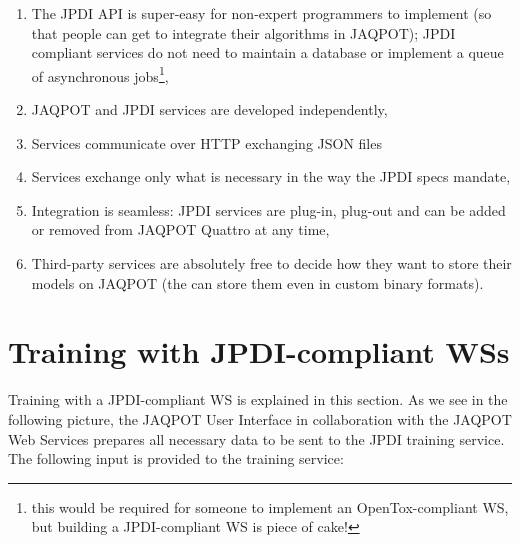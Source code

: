 \begin{enumerate}
 \item The JPDI API is super-easy for non-expert programmers to 
 implement (so that people can get to integrate their algorithms in
 JAQPOT); JPDI compliant services do not need to maintain a database
 or implement a queue of asynchronous jobs\footnote{this would be
 required for someone to implement an OpenTox-compliant WS, but building
 a JPDI-compliant WS is piece of cake!},
 \item JAQPOT and JPDI services are developed independently,
 \item Services communicate over HTTP exchanging JSON files
 \item Services exchange only what is necessary in the way the JPDI
 specs mandate,
 \item Integration is seamless: JPDI services are plug-in, plug-out 
 and can be added or removed from JAQPOT Quattro at any time,
 \item Third-party services are absolutely free to decide how they
 want to store their models on JAQPOT (the can store them even in 
 custom binary formats).
\end{enumerate}


\section{Training with JPDI-compliant WSs}
Training with a JPDI-compliant WS is explained in this section.
As we see in the following picture, the JAQPOT User Interface 
in collaboration with the JAQPOT Web Services prepares all necessary
data to be sent to the JPDI training service. The following input is
provided to the training service:

